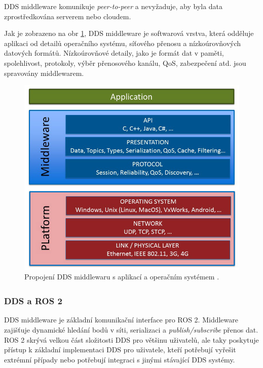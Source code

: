 \acs{DDS} middleware komunikuje \textit{peer-to-peer} a nevyžaduje, aby byla data zprostředkována serverem nebo cloudem. 

Jak je zobrazeno na obr \ref{fig:DDSmiddleware}, \acs{DDS} middleware je softwarová vrstva, která odděluje aplikaci od detailů operačního systému, síťového přenosu a nízkoúrovňových datových formátů. Nízkoúrovňové detaily, jako je formát dat v paměti, spolehlivost, protokoly, výběr přenosového kanálu, \acs{QoS}, zabezpečení atd. jsou spravovány middlewarem. 

\begin{figure}[!ht]
    \begin{center}
        \includegraphics[scale=0.4]{obrazky/DDS1}
    \end{center}
    \caption[Propojení \acs{DDS} middlewaru s aplikací a operačním systémem]{Propojení \acs{DDS} middlewaru s aplikací a operačním systémem \cite{DDS_Main}.}
    \label{fig:DDSmiddleware}
\end{figure}

\subsubsection{DDS\texorpdfstring{\textsuperscript{\textregistered}}{ (R)} a ROS 2}

\acs{DDS} middleware je základní komunikační interface pro ROS 2. Middleware zajišťuje dynamické hledání bodů v síti, serializaci a \textit{publish/subscribe} přenos dat. ROS 2 skrývá velkou část složitosti \acs{DDS} pro většinu uživatelů, ale taky poskytuje přístup k základní implementaci \acs{DDS} pro uživatele, kteří potřebují vyřešit extrémní případy nebo potřebují integraci s jinými stávající \acs{DDS} systémy. \cite{ROS2DDS}

